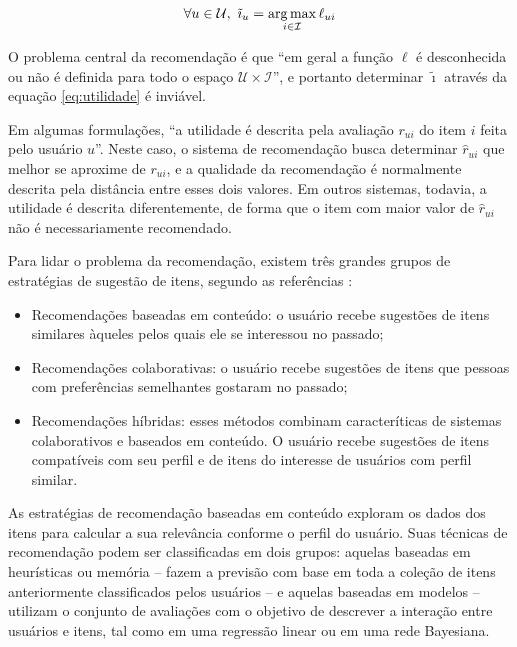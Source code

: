 \begin{equation} 
\label{eq:utilidade}
\forall u \in \mathcal{U}, ~ \tilde{\imath}_u = \operatorname*{arg\,max}_{i \in \mathcal{I}}{\ell_{ui}}
\end{equation}

O problema central da recomendação é que ``em geral a função $\ell$ é desconhecida ou não é definida para todo o espaço $\mathcal{U} \times \mathcal{I}$'', e portanto determinar $\tilde{\imath}$ através da equação \ref{eq:utilidade} é inviável. 

Em algumas formulações, ``a utilidade é descrita pela avaliação $r_{ui}$ do item $i$ feita pelo usuário $u$''. Neste caso, o sistema de recomendação busca determinar $\hat{r}_{ui}$ que melhor se aproxime de $r_{ui}$, e a qualidade da recomendação é normalmente descrita pela distância entre esses dois valores. Em outros sistemas, todavia, a utilidade é descrita diferentemente, de forma que o item com maior valor de $\hat{r}_{ui}$ não é necessariamente recomendado. 

Para lidar o problema da recomendação, existem três grandes grupos de estratégias de sugestão de itens, segundo as referências \cite{adomavicius2005toward,balabanovic97fab}:

\begin{itemize}
\item Recomendações baseadas em conteúdo: o usuário recebe sugestões de itens similares àqueles pelos quais ele se interessou no passado;
\item Recomendações colaborativas: o usuário recebe sugestões de itens que pessoas com preferências semelhantes gostaram no passado;
\item Recomendações híbridas: esses métodos combinam caracteríticas de sistemas colaborativos e baseados em conteúdo.  O usuário recebe sugestões de itens compatíveis com seu perfil e de itens do interesse de usuários com perfil similar.
\end{itemize}

As estratégias de recomendação baseadas em conteúdo exploram os dados dos itens para calcular a sua relevância conforme o perfil do usuário. Suas técnicas de recomendação podem ser classificadas em dois grupos: aquelas baseadas em heurísticas ou memória -- fazem a previsão com base em toda a coleção de itens anteriormente classificados pelos usuários -- e aquelas baseadas em modelos -- utilizam o conjunto de avaliações com o objetivo de descrever a interação entre usuários e itens, tal como em uma regressão linear ou em uma rede Bayesiana. 

